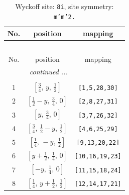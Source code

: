 \documentclass[fleqn,8pt]{jsarticle}
\begin{document}
\begin{longtable}{ccc}
\caption{Wyckoff site: {\tt 8i}, site symmetry: {\tt m'm'2.}}
 \\
 \hline \hline
No. & position & mapping \\ \hline \endfirsthead

\multicolumn{2}{l}{\tablename\ \thetable{}} \\
 \hline \hline
No. & position & mapping \\ \hline \endhead

 \hline \hline
\multicolumn{2}{r}{\footnotesize\it continued ...} \\ \endfoot

 \hline \hline
\multicolumn{2}{r}{} \\ \endlastfoot

1 & $\left[ \frac{3}{4},\, y,\, \frac{1}{2} \right]$ & {\tt [1,5,28,30]} \\ \hline
2 & $\left[ \frac{1}{2} - y,\, \frac{3}{4},\, 0 \right]$ & {\tt [2,8,27,31]} \\ \hline
3 & $\left[ y,\, \frac{3}{4},\, 0 \right]$ & {\tt [3,7,26,32]} \\ \hline
4 & $\left[ \frac{3}{4},\, \frac{1}{2} - y,\, \frac{1}{2} \right]$ & {\tt [4,6,25,29]} \\ \hline
5 & $\left[ \frac{1}{4},\, - y,\, \frac{1}{2} \right]$ & {\tt [9,13,20,22]} \\ \hline
6 & $\left[ y + \frac{1}{2},\, \frac{1}{4},\, 0 \right]$ & {\tt [10,16,19,23]} \\ \hline
7 & $\left[ - y,\, \frac{1}{4},\, 0 \right]$ & {\tt [11,15,18,24]} \\ \hline
8 & $\left[ \frac{1}{4},\, y + \frac{1}{2},\, \frac{1}{2} \right]$ & {\tt [12,14,17,21]} \\
\end{longtable}
\renewcommand{\arraystretch}{1.2}
\end{document}
